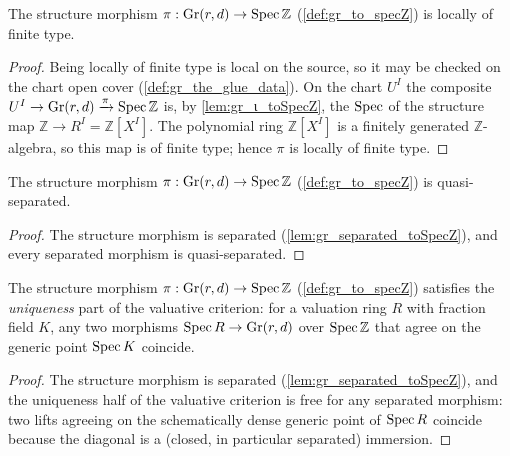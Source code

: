 \begin{lemma}\leanok
  \label{lem:gr_locallyOfFiniteType_toSpecZ}
  The structure morphism \(\pi : \mathrm{Gr}(r,d) \to \operatorname{Spec} \mathbb{Z}\)
  (\cref{def:gr_to_specZ}) is locally of finite type.
\end{lemma}
\begin{proof}
  \leanok
  Being locally of finite type is local on the source, so it may be checked on the
  chart open cover (\cref{def:gr_the_glue_data}). On the chart \(U^I\) the composite
  \(U^I \to \mathrm{Gr}(r,d) \xrightarrow{\pi} \operatorname{Spec} \mathbb{Z}\) is, by
  \cref{lem:gr_ι_toSpecZ}, the \(\operatorname{Spec}\) of the structure map \(\mathbb{Z} \to R^I
  = \mathbb{Z}[X^I]\). The polynomial ring \(\mathbb{Z}[X^I]\) is a finitely
  generated \(\mathbb{Z}\)-algebra, so this map is of finite type; hence \(\pi\) is
  locally of finite type.
\end{proof}

\begin{lemma}\leanok
  \label{lem:gr_quasiSeparated_toSpecZ}
  The structure morphism \(\pi : \mathrm{Gr}(r,d) \to \operatorname{Spec} \mathbb{Z}\)
  (\cref{def:gr_to_specZ}) is quasi-separated.
\end{lemma}
\begin{proof}
  \leanok
  The structure morphism is separated (\cref{lem:gr_separated_toSpecZ}), and every
  separated morphism is quasi-separated.
\end{proof}

\begin{lemma}\leanok
  \label{lem:gr_valuativeUniqueness_toSpecZ}
  The structure morphism \(\pi : \mathrm{Gr}(r,d) \to \operatorname{Spec} \mathbb{Z}\)
  (\cref{def:gr_to_specZ}) satisfies the \emph{uniqueness} part of the valuative
  criterion: for a valuation ring \(R\) with fraction field \(K\), any two
  morphisms \(\operatorname{Spec} R \to \mathrm{Gr}(r,d)\) over \(\operatorname{Spec} \mathbb{Z}\) that agree
  on the generic point \(\operatorname{Spec} K\) coincide.
\end{lemma}
\begin{proof}
  \leanok
  The structure morphism is separated (\cref{lem:gr_separated_toSpecZ}), and the
  uniqueness half of the valuative criterion is free for any separated morphism:
  two lifts agreeing on the schematically dense generic point of \(\operatorname{Spec} R\)
  coincide because the diagonal is a (closed, in particular separated) immersion.
\end{proof}

